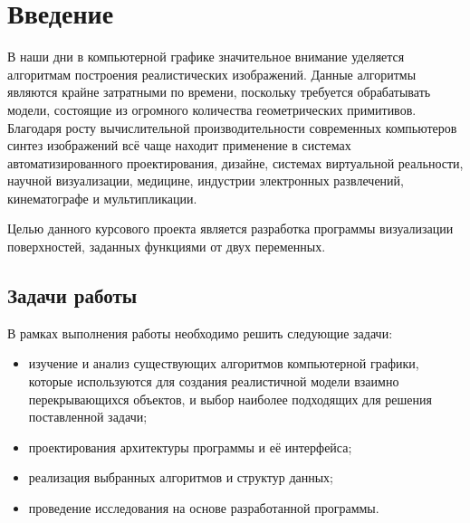 \chapter*{Введение}

В наши дни в компьютерной графике значительное внимание уделяется алгоритмам построения реалистических изображений.
Данные алгоритмы являются крайне затратными по времени, поскольку требуется обрабатывать модели, состоящие из огромного количества геометрических примитивов.
Благодаря росту вычислительной производительности современных компьютеров синтез изображений всё чаще находит применение в системах автоматизированного проектирования, дизайне, системах виртуальной реальности, научной визуализации, медицине, индустрии электронных развлечений, кинематографе и мультипликации.

Целью данного курсового проекта является разработка программы визуализации поверхностей, заданных функциями от двух переменных.

\section*{Задачи работы}

В рамках выполнения работы необходимо решить следующие задачи:
\begin{itemize}
	\item изучение и анализ существующих алгоритмов компьютерной графики, которые используются для создания реалистичной модели взаимно перекрывающихся объектов, и выбор наиболее подходящих для решения поставленной задачи;
	\item проектирования архитектуры программы и её интерфейса;
	\item реализация выбранных алгоритмов и структур данных;
	\item проведение исследования на основе разработанной программы.
\end{itemize}
